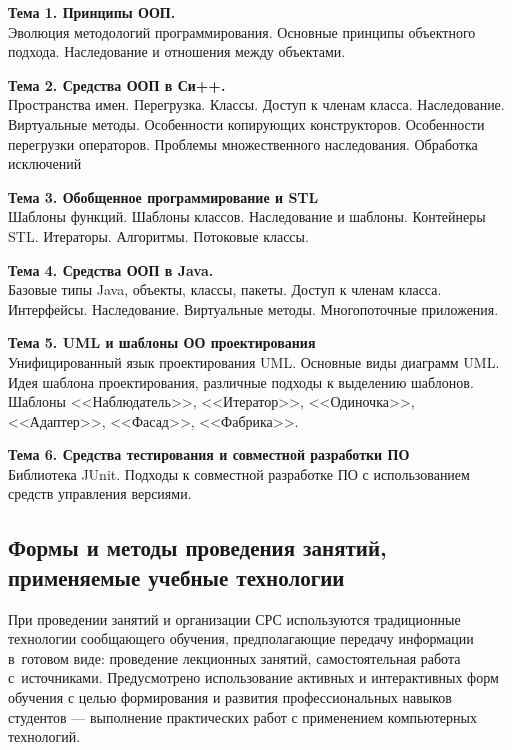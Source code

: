 \documentclass[a4paper,12pt]{article}
\begin{document}
\textbf{Тема 1. Принципы ООП.                                    }\\
Эволюция методологий программирования. Основные принципы объектного подхода. Наследование и отношения между объектами.

\textbf{Тема 2. Средства ООП в Си++.                             }\\
Пространства имен. Перегрузка. Классы. Доступ к членам класса. Наследование. Виртуальные методы. Особенности копирующих конструкторов. Особенности перегрузки операторов. Проблемы множественного наследования. Обработка исключений

\textbf{Тема 3. Обобщенное программирование и STL                }\\
Шаблоны функций. Шаблоны классов. Наследование и шаблоны. Контейнеры STL. Итераторы. Алгоритмы. Потоковые классы.

\textbf{Тема 4. Средства ООП в Java.                             }\\
Базовые типы Java, объекты, классы, пакеты. Доступ к членам класса. Интерфейсы. Наследование. Виртуальные методы. Многопоточные приложения.

\textbf{Тема 5. UML и шаблоны ОО проектирования                  }\\
Унифицированный язык проектирования UML. Основные виды диаграмм UML. Идея шаблона проектирования, различные подходы к выделению шаблонов. Шаблоны <<Наблюдатель>>, <<Итератор>>, <<Одиночка>>, <<Адаптер>>, <<Фасад>>, <<Фабрика>>.

\textbf{Тема 6. Средства тестирования и совместной разработки ПО }\\
Библиотека JUnit. Подходы к совместной разработке ПО с использованием средств управления версиями.
 

\subsection{Формы и методы проведения занятий, применяемые учебные технологии}
При проведении занятий и организации СРС используются традиционные технологии сообщающего обучения, предполагающие передачу информации в~готовом виде: проведение лекционных занятий, самостоятельная работа с~источниками. Предусмотрено использование активных и интерактивных форм обучения с целью формирования и развития профессиональных навыков студентов --- выполнение практических работ с применением компьютерных технологий. 
\end{document}
